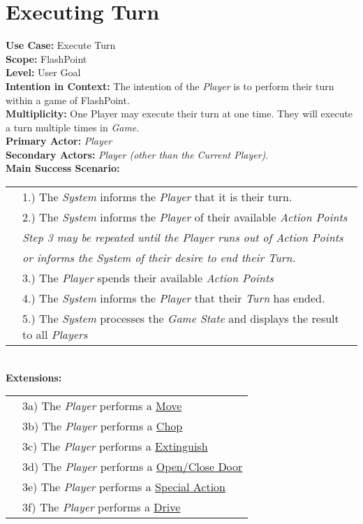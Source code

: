 \documentclass{article}
\begin{document}
	\section*{Executing Turn}
	\textbf{Use Case:} Execute Turn\\
	\textbf{Scope:} FlashPoint\\
	\textbf{Level:} User Goal\\
	\textbf{Intention in Context: } The intention of the \textit{Player} is to perform their turn within a game of FlashPoint.\\
	\textbf{Multiplicity: } One Player may execute their turn at one time. They will execute a turn multiple times in \textit{Game}.\\
	\textbf{Primary Actor:} \textit{Player} \\
	\textbf{Secondary Actors:} \textit{Player (other than the Current Player)}.\\
	\textbf{Main Success Scenario:}\\
	\begin{tabular}{l l}
		&1.) The \textit{System} informs the \textit{Player} that it is their turn.\\
		&2.) The \textit{System} informs the \textit{Player} of their available \textit{Action Points}\\
		&\textit{Step 3 may be repeated until the Player runs out of Action Points}\\
		&\qquad \textit{or informs the System of their desire to end their Turn.}\\
		&3.) The \textit{Player} spends their available \textit{Action Points}\\
		&4.) The \textit{System} informs the \textit{Player} that their \textit{Turn} has ended.\\
		&5.) The \textit{System} processes the \textit{Game State} and displays the result to all \textit{Players}
	\end{tabular}\\
	\textbf{Extensions: }\\
	\begin{tabular}{l l}
		&3a) The \textit{Player} performs a \underline{Move}\\
		&3b) The \textit{Player} performs a \underline{Chop}\\
		&3c) The \textit{Player} performs a \underline{Extinguish}\\
		&3d) The \textit{Player} performs a \underline{Open/Close Door}\\
		&3e) The \textit{Player} performs a \underline{Special Action}\\
		&3f) The \textit{Player} performs a  \underline{Drive}
	\end{tabular}
	
\end{document}
